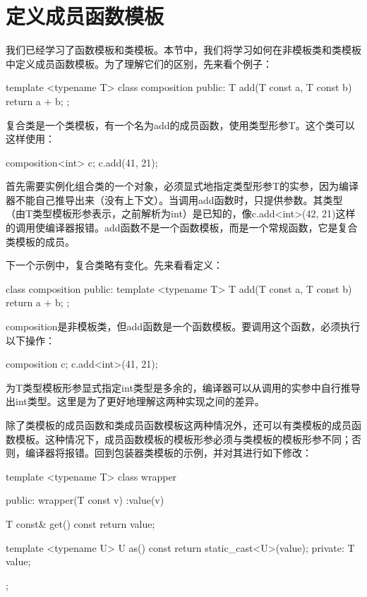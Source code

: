 \section{定义成员函数模板}
我们已经学习了函数模板和类模板。本节中，我们将学习如何在非模板类和类模板中定义成员函数模板。为了理解它们的区别，先来看个例子：

\begin{cppcode}
template <typename T>
class composition
{
public:
	T add(T const a, T const b)
	{
		return a + b;
	}
};
\end{cppcode}

复合类是一个类模板，有一个名为add的成员函数，使用类型形参T。这个类可以这样使用：

\begin{cppcode}
composition<int> c;
c.add(41, 21);
\end{cppcode}

首先需要实例化组合类的一个对象，必须显式地指定类型形参T的实参，因为编译器不能自己推导出来（没有上下文）。当调用add函数时，只提供参数。其类型（由T类型模板形参表示，之前解析为int）是已知的，像c.add<int>(42, 21)这样的调用使编译器报错。add函数不是一个函数模板，而是一个常规函数，它是复合类模板的成员。

下一个示例中，复合类略有变化。先来看看定义：

\begin{cppcode}
class composition
{
public:
	template <typename T>
	T add(T const a, T const b)
	{
		return a + b;
	}
};
\end{cppcode}

composition是非模板类，但add函数是一个函数模板。要调用这个函数，必须执行以下操作：

\begin{cppcode}
composition c;
c.add<int>(41, 21);
\end{cppcode}

为T类型模板形参显式指定int类型是多余的，编译器可以从调用的实参中自行推导出int类型。这里是为了更好地理解这两种实现之间的差异。

除了类模板的成员函数和类成员函数模板这两种情况外，还可以有类模板的成员函数模板。这种情况下，成员函数模板的模板形参必须与类模板的模板形参不同；否则，编译器将报错。回到包装器类模板的示例，并对其进行如下修改：

\begin{cppcode}
template <typename T>
class wrapper
{
public:
	wrapper(T const v) :value(v)
	{}
	
	T const& get() const { return value; }
	
	template <typename U>
	U as() const
	{
		return static_cast<U>(value);
	}
private:
	T value;
};
\end{cppcode}

